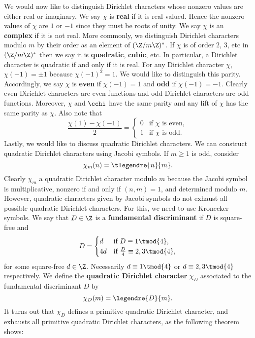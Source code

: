       We would now like to distinguish Dirichlet characters whose nonzero values are either real or imaginary. We say $\chi$ is \textbf{real} if it is real-valued. Hence the nonzero values of $\chi$ are $1$ or $-1$ since they must be roots of unity. We say $\chi$ is an \textbf{complex} if it is not real. More commonly, we distinguish Dirichlet characters modulo $m$ by their order as an element of $(\Z/m\Z)^{\ast}$. If $\chi$ is of order $2$, $3$, etc in $(\Z/m\Z)^{\ast}$ then we say it is \textbf{quadratic}, \textbf{cubic}, etc. In particular, a Dirichlet character is quadratic if and only if it is real. For any Dirichlet character $\chi$, $\chi(-1) = \pm 1$ because $\chi(-1)^{2} = 1$. We would like to distinguish this parity. Accordingly, we say $\chi$ is \textbf{even} if $\chi(-1) = 1$ and \textbf{odd} if $\chi(-1) = -1$. Clearly even Dirichlet characters are even functions and odd Dirichlet characters are odd functions. Moreover, $\chi$ and $\cchi$ have the same parity and any lift of $\chi$ has the same parity as $\chi$. Also note that
      \[
        \frac{\chi(1)-\chi(-1)}{2} = \begin{cases} 0 & \text{if $\chi$ is even}, \\ 1 & \text{if $\chi$ is odd}. \end{cases}
      \]
      Lastly, we would like to discuss quadratic Dirichlet characters. We can construct quadratic Dirichlet characters using Jacobi symbols. If $m \ge 1$ is odd, consider
      \[
        \chi_{m}(n) = \tlegendre{n}{m}.
      \]
      Clearly $\chi_{m}$ a quadratic Dirichlet character modulo $m$ because the Jacobi symbol is multiplicative, nonzero if and only if $(n,m) = 1$, and determined modulo $m$. However, quadratic characters given by Jacobi symbols do not exhaust all possible quadratic Dirichlet characters. For this, we need to use Kronecker symbols. We say that $D \in \Z$ is a \textbf{fundamental discriminant} if $D$ is square-free and
      \[
        D = \begin{cases} d & \text{if $D \equiv 1 \tmod{4}$}, \\ 4d & \text{if $\frac{D}{4} \equiv 2,3 \tmod{4}$}, \end{cases}
      \]
      for some square-free $d \in \Z$. Necessarily $d \equiv 1 \tmod{4}$ or $d \equiv 2,3 \tmod{4}$ respectively. We define the \textbf{quadratic Dirichlet character} $\chi_{D}$ associated to the fundamental discriminant $D$ by
      \[
        \chi_{D}(m) = \legendre{D}{m}.
      \]
      It turns out that $\chi_{D}$ defines a primitive quadratic Dirichlet character, and exhausts all primitive quadratic Dirichlet characters, as the following theorem shows:

